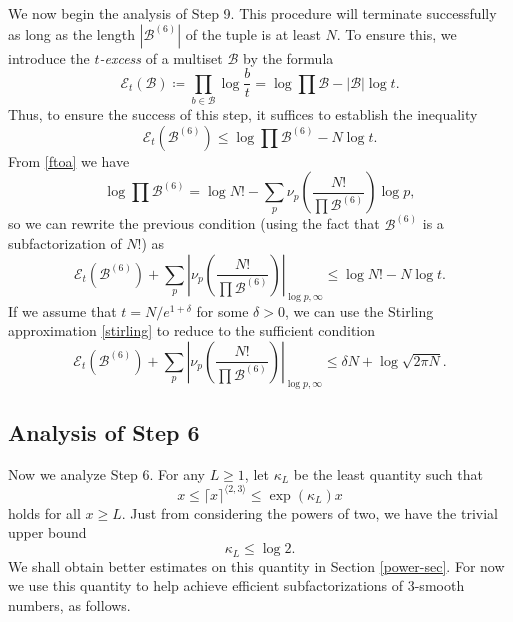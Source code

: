 \documentclass[12pt,a4paper,reqno]{amsart}
\numberwithin{equation}{section}
\theoremstyle{plain}
\theoremstyle{definition}
\newcommand\tuple{{\mathcal B}}
\newcommand\excess{{\mathcal{E}}}
\begin{document}
We now begin the analysis of Step 9.  This procedure will terminate successfully as long as the length $|\tuple^{(6)}|$ of the tuple is at least $N$.  To ensure this, we introduce the \emph{$t$-excess} of a multiset $\tuple$ by the formula
$$
\excess_t(\tuple) \coloneqq \prod_{b \in \tuple} \log \frac{b}{t} = \log \prod \tuple - |\tuple| \log t.$$
Thus, to ensure the success of this step, it suffices to establish the inequality
$$
\excess_t(\tuple^{(6)}) \leq \log \prod \tuple^{(6)} - N \log t.$$
From \eqref{ftoa} we have
$$ \log \prod \tuple^{(6)} = \log N! - \sum_p \nu_p\left(\frac{N!}{\prod \tuple^{(6)}}\right) \log p,$$
so we can rewrite the previous condition (using the fact that $\tuple^{(6)}$ is a subfactorization of $N!$) as
$$
\excess_t(\tuple^{(6)}) + \sum_p \left| \nu_p\left(\frac{N!}{\prod \tuple^{(6)}}\right) \right|_{\log p,\infty}
\leq \log N! - N \log t.$$
If we assume that $t = N/e^{1+\delta}$ for some $\delta > 0$, we can use the Stirling approximation \eqref{stirling} to reduce to the sufficient condition
\begin{equation}\label{step7-cond}
\excess_t(\tuple^{(6)}) + \sum_p \left| \nu_p\left(\frac{N!}{\prod \tuple^{(6)}}\right) \right|_{\log p,\infty}
\leq \delta N + \log \sqrt{2\pi N}.
\end{equation}

\subsection{Analysis of Step 6}

Now we analyze Step 6. For any $L \geq 1$, let $\kappa_L$ be the least quantity such that
\begin{equation}\label{kappa-def}  
  x \leq \lceil x \rceil^{\langle 2,3\rangle} \leq \exp(\kappa_L) x 
\end{equation}
holds for all $x \geq L$. Just from considering the powers of two, we have the trivial upper bound
\begin{equation}\label{kl-triv}
  \kappa_L \leq \log 2.
\end{equation}
We shall obtain better estimates on this quantity in Section \ref{power-sec}. For now we use this quantity to help achieve efficient subfactorizations of $3$-smooth numbers, as follows.
\end{document}
